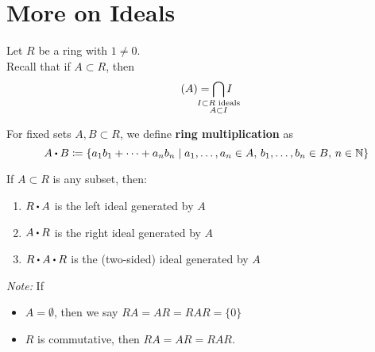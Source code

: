 \documentclass[../Main.tex]{subfiles}
\begin{document}
\chapter{More on Ideals}
Let $R$ be a ring with $1\ne 0$.\\
Recall that if $A\subset R$, then
	\[(A)= \bigcap_{\mathclap{\substack{I \subset R \text{ ideals}\\A\subset I} } } I\]
\begin{dfn}[title= Ring Multiplication]
	For fixed sets $A,B \subset R$, we define \textbf{ring multiplication} as
	\[A\rdot B \coloneqq \{a_1b_1 + \dots + a_nb_n \mid a_1,\dots, a_n \in A,\, b_1, \dots, b_n \in B,\, n\in \N\}\]
\end{dfn}
\begin{prop}[title = Characterization of ideal generated by a set]
	If $A\subset R$ is any subset, then:
	\begin{enumerate}
		\item $R\rdot A$ is the left ideal generated by $A$
		\item $A\rdot R $ is the right ideal generated by $A$
		\item $R\rdot A\rdot R$ is the (two-sided) ideal generated by $A$
	\end{enumerate}
\textit{Note:} If
\begin{itemize}
	\item $A=\emptyset$, then we say $RA=AR=RAR=\{0\}$
	\item $R$ is commutative, then $RA=AR=RAR$.
\end{itemize}
\end{prop}
\end{document}
